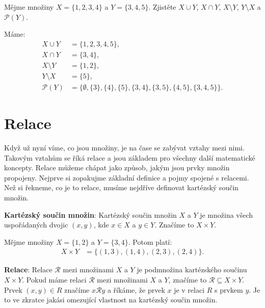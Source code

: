 \begin{problem}
  Mějme množiny $X = \{1, 2, 3, 4\}$ a $Y = \{3, 4, 5\}$. Zjistěte $X\cup Y$, $X\cap Y$, $X\setminus Y$, $Y\setminus X$ a $\mathcal{P}(Y)$.
\end{problem}

\begin{solution}
  Máme:
  \begin{align*}
    X\cup Y &= \{1, 2, 3, 4, 5\},\\
    X\cap Y &= \{3, 4\},\\
    X\setminus Y &= \{1, 2\},\\
    Y\setminus X &= \{5\},\\
    \mathcal{P}(Y) &= \{\emptyset, \{3\}, \{4\}, \{5\}, \{3, 4\}, \{3, 5\}, \{4, 5\}, \{3, 4, 5\}\}.
  \end{align*}
\end{solution}


\section{Relace}
Když už nyní víme, co jsou množiny, je na čase se zabývat vztahy mezi nimi. Takovým vztahům se říká relace a jsou základem pro všechny další matematické koncepty. Relace můžeme chápat jako způsob, jakým jsou prvky množin propojeny. Nejprve si zopakujme základní definice a pojmy spojené s relacemi. Než si řekneme, co je to relace, musíme nejdříve definovat kartézský součin množin.

\begin{definitionbox}
  \textbf{Kartézský součin množin}: Kartézský součin množin $X$ a $Y$ je množina všech uspořádaných dvojic $(x, y)$, kde $x\in X$ a $y\in Y$. Značíme to $X\times Y$. 
\end{definitionbox}

\begin{example}
  Mějme množiny $X = \{1, 2\}$ a $Y = \{3, 4\}$. Potom platí:
  \begin{align*}
    X\times Y &= \{(1, 3), (1, 4), (2, 3), (2, 4)\}.
  \end{align*}
\end{example}

\begin{definitionbox}
  \textbf{Relace}: Relace $\mathcal R$ mezi množinami $X$ a $Y$ je podmnožina kartézského součinu $X\times Y$. Pokud máme relaci $\mathcal R$ mezi množinami $X$ a $Y$, značíme to $\mathcal R\subseteq X\times Y$. Prvek $(x, y)\in R$ značíme $x\mathcal Ry$ a říkáme, že prvek $x$ je v relaci $R$ s prvkem $y$. Je to ve zkratce jakási omezující vlastnost na kartézský součin množin. 
\end{definitionbox}

